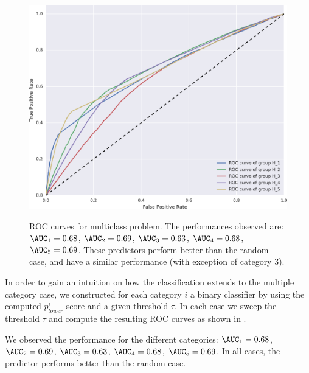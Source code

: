 \begin{figure}[h]
\centering
{\includegraphics[width=0.9\columnwidth]
{figures/ROC_multiclass/ROC_multiclass.png}}
\caption{ROC curves for multiclass problem. The performances observed are: \( \AUC_1 = 0.68 \), \( \AUC_2 = 0.69 \), \( \AUC_3 = 0.63 \), \( \AUC_4 = 0.68 \), \( \AUC_5 = 0.69 \). These predictors perform better than the random case, and have a similar performance (with exception of category 3).}
\label{roc_multiple_categories}
\end{figure}

In order to gain an intuition on how the classification extends to the multiple category case, we constructed for each category \( i \) a binary classifier by using the computed \( p^i_{lower} \) score and a given threshold \( \tau \). In each case we sweep the threshold \( \tau \) and compute the resulting ROC curves as shown in .

We observed the performance for the different categories: \( \AUC_1 = 0.68 \), \( \AUC_2 = 0.69 \), \( \AUC_3=0.63 \), \( \AUC_4 = 0.68 \), \( \AUC_5 = 0.69 \). In all cases, the predictor performs better than the random case.


